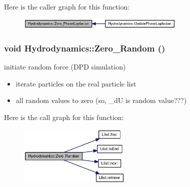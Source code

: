 Here is the caller graph for this function:\nopagebreak
\begin{figure}[H]
\begin{center}
\leavevmode
\includegraphics[width=227pt]{classHydrodynamics_d1c5fd5b500eacb886a72f2dab13e91b_icgraph}
\end{center}
\end{figure}
\hypertarget{classHydrodynamics_f67579320cbdccaf49bbdf3dfb13f23c}{
\subsubsection[{Zero\_\-Random}]{\setlength{\rightskip}{0pt plus 5cm}void Hydrodynamics::Zero\_\-Random ()}}
\label{classHydrodynamics_f67579320cbdccaf49bbdf3dfb13f23c}


initiate random force (DPD simulation) 



\begin{itemize}
\item iterate particles on the real particle list\end{itemize}


\begin{itemize}
\item all random values to zero (so, \_\-dU is random value???) \end{itemize}


Here is the call graph for this function:\nopagebreak
\begin{figure}[H]
\begin{center}
\leavevmode
\includegraphics[width=151pt]{classHydrodynamics_f67579320cbdccaf49bbdf3dfb13f23c_cgraph}
\end{center}
\end{figure}


